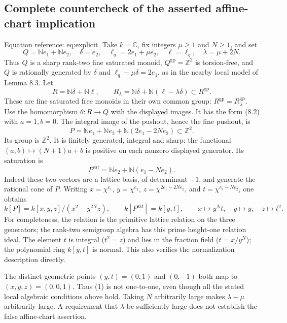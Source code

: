 \documentclass[10pt]{article}
\begin{document}
\subsection*{Complete countercheck of the asserted affine-chart implication}
Equation reference: eq:explicit. Take \(k=\mathbb C\), fix integers \(\mu\geq1\) and \(N\geq1\), and set \[Q=\mathbb Ne_1+\mathbb Ne_2,\quad
 \delta=e_2,\quad \ell_q=2e_1+\mu e_2,\quad \ell=\ell_q,\quad
 \lambda=\mu+2N.\] Thus \(Q\) is a sharp rank-two fine saturated monoid, \(Q^\mathrm{gp}=\mathbb Z^2\) is torsion-free, and \(Q\) is rationally generated by \(\delta\) and \(\ell_q-\mu\delta=2e_1\), as in the nearby local model of Lemma 8.3. Let \[R=\mathbb N\delta+\mathbb N\ell,\qquad
 R_\lambda=\mathbb N\delta+\mathbb N(\ell-\lambda\delta)\subset R^\mathrm{gp}.\] These are fine saturated free monoids in their own common group: \(R^\mathrm{gp}=R_\lambda^\mathrm{gp}\). Use the homomorphism \(\theta:R\to Q\) with the displayed images. It has the form (8.2) with \(a=1,b=0\). The integral image of the pushout, hence the fine pushout, is \[P=\mathbb Ne_1+\mathbb Ne_2+\mathbb N(2e_1-2Ne_2)\subset\mathbb Z^2.\] Its group is \(\mathbb Z^2\). It is finitely generated, integral and sharp: the functional \((a,b)\mapsto(N+1)a+b\) is positive on each nonzero displayed generator. Its saturation is \[P^\mathrm{sat}=\mathbb Ne_2+\mathbb N(e_1-Ne_2).\] Indeed these two vectors are a lattice basis, of determinant \(-1\), and generate the rational cone of \(P\). Writing \(x=\chi^{e_1}\), \(y=\chi^{e_2}\), \(z=\chi^{2e_1-2Ne_2}\), and \(t=\chi^{e_1-Ne_2}\), one obtains \[k[P]=k[x,y,z]/(x^2-y^{2N}z),\qquad
 k[P^\mathrm{sat}]=k[y,t],\qquad
 x\mapsto y^Nt,\quad y\mapsto y,\quad z\mapsto t^2.
\tag{2}\] For completeness, the relation is the primitive lattice relation on the three generators; the rank-two semigroup algebra has this prime height-one relation ideal. The element \(t\) is integral (\(t^2=z\)) and lies in the fraction field (\(t=x/y^N\)); the polynomial ring \(k[y,t]\) is normal. This also verifies the normalization description directly.\par
The distinct geometric points \((y,t)=(0,1)\) and \((0,-1)\) both map to \((x,y,z)=(0,0,1)\). Thus (1) is not one-to-one, even though all the stated local algebraic conditions above hold. Taking \(N\) arbitrarily large makes \(\lambda-\mu\) arbitrarily large. A requirement that \(\lambda\) be sufficiently large does not establish the false affine-chart assertion.\par
\end{document}
